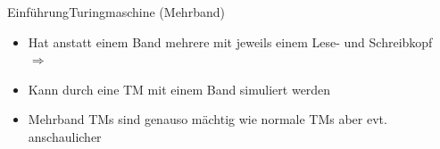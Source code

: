 \documentclass[ignorenonframetext,]{beamer}
\begin{document}
\begin{frame}{Einführung}{Turingmaschine (Mehrband)}

\begin{itemize}
\itemsep1pt\parskip0pt
\item
  Hat anstatt einem Band mehrere mit jeweils einem Lese- und
  Schreibkopf\\
$\Rightarrow$
\item
  Kann durch eine TM mit einem Band simuliert
  werden\\
\item
  Mehrband TMs sind genauso mächtig wie normale TMs aber evt.
  anschaulicher
\end{itemize}

\end{frame}
\end{document}
